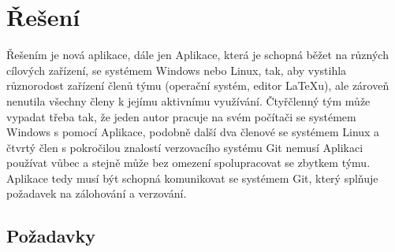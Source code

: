 \chapter{Řešení}
Řešením je nová aplikace, dále jen Aplikace, která je schopná běžet na různých cílových zařízení, se systémem Windows nebo Linux, tak, aby vystihla různorodost zařízení členů týmu (operační systém, editor LaTeXu), ale zároveň nenutila všechny členy k jejímu aktivnímu využívání. Čtyřčlenný tým může vypadat třeba tak, že jeden autor pracuje na svém počítači se systémem Windows s pomocí Aplikace, podobně další dva členové se systémem Linux a čtvrtý člen s pokročilou znalostí verzovacího systému Git nemusí Aplikaci používat vůbec a stejně může bez omezení spolupracovat se zbytkem týmu. Aplikace tedy musí být schopná komunikovat se systémem Git, který splňuje požadavek na zálohování a verzování.

\section{Požadavky}

